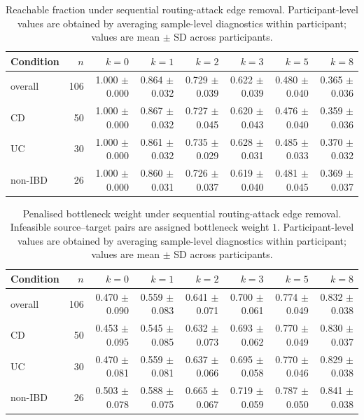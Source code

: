 \begin{table}[ht]
\centering
\caption{Reachable fraction under sequential routing-attack edge removal. Participant-level values are obtained by averaging sample-level diagnostics within participant; values are mean $\pm$ SD across participants.}
\label{tab:sequential_attack_reachable_fraction}
\begin{tabular}{lrrrrrrr}
\toprule
Condition & $n$ & $k=0$ & $k=1$ & $k=2$ & $k=3$ & $k=5$ & $k=8$ \\
\midrule
overall & 106 & 1.000 $\pm$ 0.000 & 0.864 $\pm$ 0.032 & 0.729 $\pm$ 0.039 & 0.622 $\pm$ 0.039 & 0.480 $\pm$ 0.040 & 0.365 $\pm$ 0.036 \\
CD & 50 & 1.000 $\pm$ 0.000 & 0.867 $\pm$ 0.032 & 0.727 $\pm$ 0.045 & 0.620 $\pm$ 0.043 & 0.476 $\pm$ 0.040 & 0.359 $\pm$ 0.036 \\
UC & 30 & 1.000 $\pm$ 0.000 & 0.861 $\pm$ 0.032 & 0.735 $\pm$ 0.029 & 0.628 $\pm$ 0.031 & 0.485 $\pm$ 0.033 & 0.370 $\pm$ 0.032 \\
non-IBD & 26 & 1.000 $\pm$ 0.000 & 0.860 $\pm$ 0.031 & 0.726 $\pm$ 0.037 & 0.619 $\pm$ 0.040 & 0.481 $\pm$ 0.045 & 0.369 $\pm$ 0.037 \\
\bottomrule
\end{tabular}
\end{table}


\begin{table}[ht]
\centering
\caption{Penalised bottleneck weight under sequential routing-attack edge removal. Infeasible source--target pairs are assigned bottleneck weight $1$. Participant-level values are obtained by averaging sample-level diagnostics within participant; values are mean $\pm$ SD across participants.}
\label{tab:sequential_attack_penalized_bottleneck_w}
\begin{tabular}{lrrrrrrr}
\toprule
Condition & $n$ & $k=0$ & $k=1$ & $k=2$ & $k=3$ & $k=5$ & $k=8$ \\
\midrule
overall & 106 & 0.470 $\pm$ 0.090 & 0.559 $\pm$ 0.083 & 0.641 $\pm$ 0.071 & 0.700 $\pm$ 0.061 & 0.774 $\pm$ 0.049 & 0.832 $\pm$ 0.038 \\
CD & 50 & 0.453 $\pm$ 0.095 & 0.545 $\pm$ 0.085 & 0.632 $\pm$ 0.073 & 0.693 $\pm$ 0.062 & 0.770 $\pm$ 0.049 & 0.830 $\pm$ 0.037 \\
UC & 30 & 0.470 $\pm$ 0.081 & 0.559 $\pm$ 0.081 & 0.637 $\pm$ 0.066 & 0.695 $\pm$ 0.058 & 0.770 $\pm$ 0.046 & 0.829 $\pm$ 0.038 \\
non-IBD & 26 & 0.503 $\pm$ 0.078 & 0.588 $\pm$ 0.075 & 0.665 $\pm$ 0.067 & 0.719 $\pm$ 0.059 & 0.787 $\pm$ 0.050 & 0.841 $\pm$ 0.038 \\
\bottomrule
\end{tabular}
\end{table}


